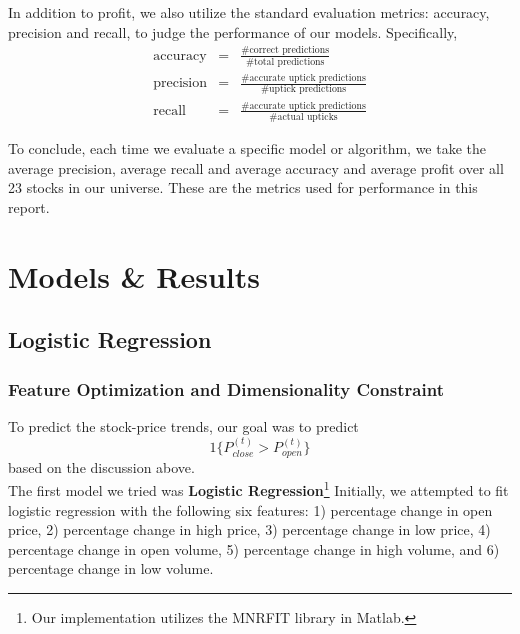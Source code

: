 \documentclass[10pt,twocolumn,letterpaper]{article}
\begin{document}
In addition to profit, we also utilize the standard evaluation metrics: accuracy, precision and recall, to judge the performance of our models. Specifically,
\begin{eqnarray*}
\text{accuracy} &=& \frac{ \text{\# correct predictions}}{\text{\# total predictions}} \\
\text{precision} &=& \frac{ \text{\# accurate uptick predictions}}{\text{\# uptick predictions}} \\
\text{recall} &=& \frac{ \text{\# accurate uptick predictions}}{\text{\# actual upticks}}
\end{eqnarray*}

To conclude, each time we evaluate a specific model or algorithm, we take the average precision, average recall and average accuracy and average profit over all 23 stocks in our universe. These are the metrics used for performance in this report.
 
\section{Models \& Results}
\subsection{Logistic Regression}
\subsubsection{Feature Optimization and Dimensionality Constraint}
To predict the stock-price trends, our goal was to predict
\[1\{{P_{close}^{(t)}>P_{open}^{(t)}}\}\]
based on the discussion above.\\

The first model we tried was \textbf{Logistic Regression}\footnote{Our implementation utilizes the MNRFIT library in Matlab.} Initially, we attempted to fit logistic regression with the following six features: 1) percentage change in open price, 2) percentage change in high price, 3) percentage change in low price, 4) percentage change in open volume, 5) percentage change in high volume, and 6) percentage change in low volume.\\
\end{document}
